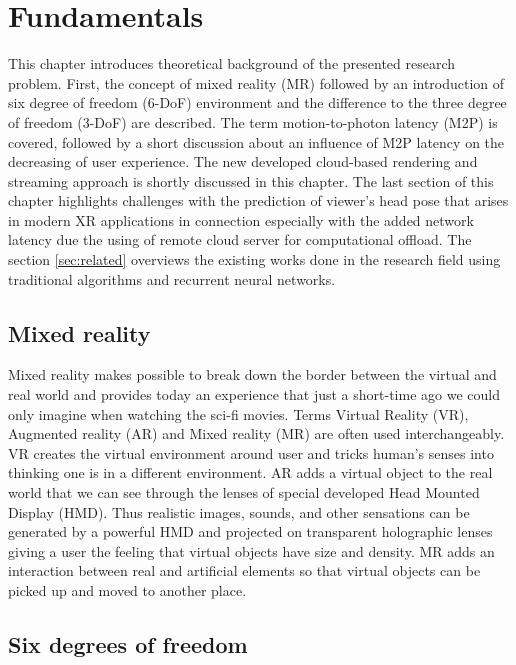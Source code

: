 
\chapter{Fundamentals}
\label{sec:theorie}
This chapter introduces theoretical background of the presented research problem. First, the concept of mixed reality (MR) followed by an introduction of six degree of freedom (6-DoF) environment and the difference to the three degree of freedom (3-DoF) are described. The term motion-to-photon latency (M2P) is covered, followed by a short discussion about an influence of M2P latency on the decreasing of user experience. The new developed cloud-based rendering and streaming approach is shortly discussed in this chapter. The last section of this chapter highlights challenges with the prediction of viewer's head pose that arises in modern XR applications in connection especially with the added network latency due the using of remote cloud server for computational offload. The section \ref{sec:related} overviews the existing works done in the research field using traditional algorithms and recurrent neural networks. 

\section{Mixed reality}
\label{sec:theorie:ar}
Mixed reality makes possible to break down the border between the virtual and real world and provides today an experience that just a short-time ago we could only imagine when watching the sci-fi movies. Terms Virtual Reality (VR), Augmented reality (AR) and Mixed reality (MR) are often used interchangeably. VR creates the virtual environment around user and tricks human's senses into thinking one is in a different environment. AR adds a virtual object to the real world that we can see through the lenses of special developed Head Mounted Display (HMD). Thus realistic images, sounds, and other sensations can be generated by a powerful HMD and projected on transparent holographic lenses giving a user the feeling that virtual objects have size and density. MR adds an interaction between real and artificial elements so that virtual objects can be picked up and moved to another place. 


\section{Six degrees of freedom}
\label{sec:theorie:6dof} 

